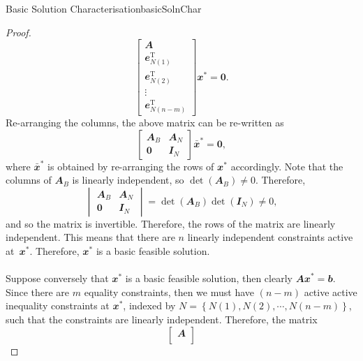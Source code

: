 \documentclass[math, code]{amznotes}
\theoremstyle{remark}
\begin{document}
\begin{thmbox}{Basic Solution Characterisation}{basicSolnChar}
\begin{proof}
\begin{equation*}
\begin{bmatrix}
                \mathbfit{A} \\
                \mathbfit{e}^{\mathrm{T}}_{N(1)} \\
                \mathbfit{e}^{\mathrm{T}}_{N(2)} \\
                \vdots \\
                \mathbfit{e}^{\mathrm{T}}_{N(n - m)}
            \end{bmatrix}\mathbfit{x}^* = \mathbf{0}.
        \end{equation*}
        Re-arranging the columns, the above matrix can be re-written as
        \begin{equation*}
            \begin{bmatrix}
                \mathbfit{A}_B & \mathbfit{A}_N \\
                \mathbf{0} & \mathbfit{I}_N
            \end{bmatrix}\mathbfit{\bar{x}}^* = \mathbf{0},
        \end{equation*}
        where $\mathbfit{\bar{x}}^*$ is obtained by re-arranging the rows of $\mathbfit{x}^*$ accordingly. Note that the columns of $\mathbfit{A}_B$ is linearly independent, so $\det(\mathbfit{A}_B) \neq 0$. Therefore, 
        \begin{equation*}
            \begin{vmatrix}
                \mathbfit{A}_B & \mathbfit{A}_N \\
                \mathbf{0} & \mathbfit{I}_N
            \end{vmatrix} = \det(\mathbfit{A}_B)\det(\mathbfit{I}_N) \neq 0,
        \end{equation*}
        and so the matrix is invertible. Therefore, the rows of the matrix are linearly independent. This means that there are $n$ linearly independent constraints active at~$\mathbfit{x}^*$. Therefore, $\mathbfit{x}^*$ is a basic feasible solution.
        \\\\
        Suppose conversely that $\mathbfit{x}^*$ is a basic feasible solution, then clearly $\mathbfit{Ax}^* = \mathbfit{b}$. Since there are $m$ equality constraints, then we must have $(n - m)$ active active inequality constraints at $\mathbfit{x}^*$, indexed by $N = \left\{N(1), N(2), \cdots, N(n - m)\right\}$, such that the constraints are linearly independent. Therefore, the matrix
        \begin{equation*}
            \begin{bmatrix}
                \mathbfit{A} \\

\end{bmatrix}
\end{equation*}
\end{proof}
\end{thmbox}
\end{document}
